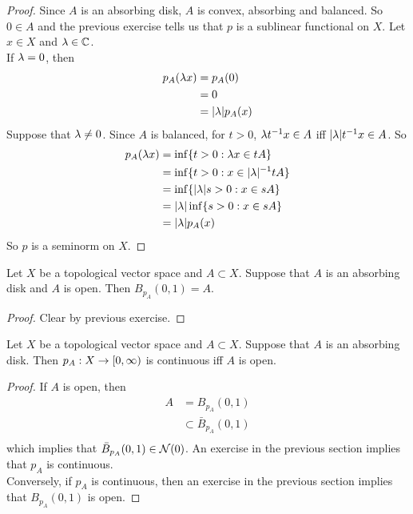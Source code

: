 \documentclass{book}
\begin{document}
	\begin{proof} Since $A$ is an absorbing disk, $A$ is convex, absorbing and balanced. So $0 \in A$ and the previous exercise tells us that $p$ is a sublinear functional on $X$. Let $x\in X$ and $\lambda \in \mathbb{C}$. \\
		If $\lambda =0$, then 
				\begin{align*}
					p_A(\lambda x) 
					&= p_A(0) \\
					&= 0 \\
					&= |\lambda| p_A(x)
				\end{align*}
		Suppose that $\lambda \neq 0$. Since $A$ is balanced, for $t >0$, $\lambda t^{-1} x \in A$ iff $|\lambda| t^{-1} x \in A$. So
				\begin{align*}
					p_A(\lambda x) 
					&= \inf \{t > 0: \lambda x \in tA\} \\
					&= \inf \{t > 0: x \in |\lambda|^{-1} tA\} \\
					&= \inf \{|\lambda| s > 0: x \in sA\} \\
					&= |\lambda|\inf \{ s > 0: x \in sA\} \\
					&= |\lambda | p_A(x)
				\end{align*}
	So $p$ is a seminorm on $X$.
	\end{proof}
	
	\begin{ex}
		Let $X$ be a topological vector space and $A \subset X$. Suppose that $A$ is an absorbing disk and $A$ is open. Then $B_{p_A}(0, 1) = A$.
	\end{ex}

	\begin{proof}
		Clear by previous exercise.
	\end{proof}

	\begin{ex}
		Let $X$ be a topological vector space and $A \subset X$. Suppose that $A$ is an absorbing disk. Then $p_A:X \rightarrow [0,\infty)$ is continuous iff $A$ is open. 
	\end{ex}

	\begin{proof}
		If $A$ is open, then 
		\begin{align*}
			A 
			&= B_{p_A}(0,1) \\
			& \subset \bar{B}_{p_A}(0,1) \\
		\end{align*}
		which implies that $\bar{B}_{p_A}(0,1) \in \mathcal{N}(0)$. An exercise in the previous section implies that $p_A$ is continuous. \\
		Conversely, if $p_A$ is continuous, then an exercise in the previous section implies that $B_{p_A}(0,1)$ is open. 
	\end{proof}
	
\end{document}
